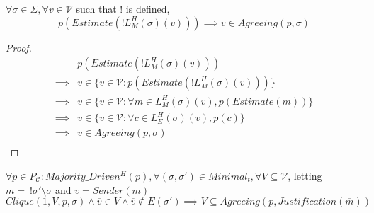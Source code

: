 \begin{lemma}
$\forall \sigma \in \Sigma, \forall v \in \mathcal{V}$ such that ! is defined,
$$
p(Estimate(!L^H_M(\sigma)(v))) \implies v \in Agreeing(p, \sigma)
$$
\end{lemma}

\begin{proof}
\begin{align}
        &p(Estimate(!L^H_M(\sigma)(v))) \\
\implies& v \in \{ v \in \mathcal{V} : p(Estimate(!L^H_M(\sigma)(v))) \} \\
\implies& v \in \{ v \in \mathcal{V} : \forall m \in L^H_M(\sigma)(v), p(Estimate(m)) \} \\
\implies& v \in \{ v \in \mathcal{V} : \forall c \in L^H_E(\sigma)(v), p(c) \} \\
\implies& v \in Agreeing(p, \sigma) \\
\end{align}
\end{proof}


\begin{lemma}
$\forall p \in P_{\mathcal{C}} : Majority\_Driven^H(p), \forall (\sigma, \sigma') \in Minimal_t, \forall V \subseteq \mathcal{V}$, letting $\overline{m} =~!\sigma'\setminus\sigma$ and $\overline{v} = Sender(\overline{m})$
$$
Clique(1, V, p, \sigma) \land \overline{v} \in V \land \overline{v} \notin E(\sigma') \implies V \subseteq Agreeing(p, Justification(\overline{m}))
$$
\end{lemma}


